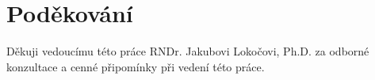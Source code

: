 \section*{Poděkování}
Děkuji vedoucímu této práce RNDr. Jakubovi Lokočovi, Ph.D. za odborné konzultace a cenné připomínky při vedení této práce.
\newpage